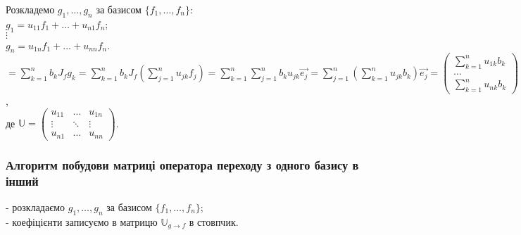 \documentclass[a4paper, 10pt]{article}
\theoremstyle{theoremdd}
\begin{document}
Розкладемо $g_1,\dots,g_n$ за базисом $\{f_1,\dots, f_n\}$:\\
$g_1 = u_{11}f_1 + \dots + u_{n1}f_n$;\\
$\vdots$\\
$g_n = u_{1n}f_1 + \dots + u_{nn}f_n$.\\
$\boxed{=} \displaystyle \sum_{k=1}^n b_k J_f g_k = \sum_{k=1}^n b_k J_f \left(\sum_{j=1}^n u_{jk} f_j\right) = \sum_{k=1}^n \sum_{j=1}^n b_k u_{jk} \vec{e_j} = \sum_{j=1}^n \left(\sum_{k=1}^n u_{jk} b_k \right) \vec{e_j} = \begin{pmatrix}
 \displaystyle \sum_{k=1}^n u_{1k} b_k \\ \dots \\ \displaystyle \sum_{k=1}^n u_{nk} b_k
\end{pmatrix} = \mathbb{U} \vec{x_g}$,\\
де $\mathbb{U} = \begin{pmatrix}
u_{11} & \dots & u_{1n} \\
\vdots & \ddots & \vdots \\
u_{n1} & \dots & u_{nn}
\end{pmatrix}$.
\subsubsection*{Алгоритм побудови матриці оператора переходу з одного базису в інший}
- розкладаємо $g_1,\dots,g_n$ за базисом $\{f_1,\dots,f_n\}$;\\
- коефіцієнти записуємо в матрицю $\mathbb{U}_{g \to f}$ в стовпчик.
\end{document}
